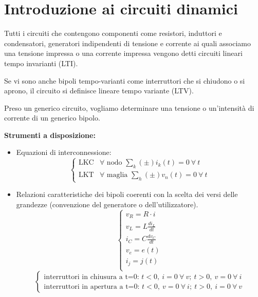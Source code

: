 \section{Introduzione ai circuiti dinamici}
Tutti i circuiti che contengono componenti come
resistori, induttori e condensatori, generatori indipendenti di tensione e corrente ai quali associamo 
una tensione impressa o una corrente impressa vengono detti circuiti lineari tempo invarianti (LTI).

Se vi sono anche bipoli tempo-varianti come interruttori che si chiudono o si aprono, il circuito
si definisce lineare tempo variante (LTV).

Preso un generico circuito, vogliamo determinare una tensione o un'intensità di corrente di un generico
bipolo.

\textbf{Strumenti a disposizione:}

\begin{itemize}
\item Equazioni di interconnessione:
\begin{equation} \label{eq:leggi_kirchooff}
\begin{cases}
        \text{LKC} & \forall \text{ nodo } \sum_{k} (\pm) i_k(t) = 0\ \forall\ t \\
        \text{LKT} & \forall \text{ maglia } \sum_{h} (\pm) v_n(t) = 0\ \forall\ t
\end{cases}
\end{equation}

\item Relazioni caratteristiche dei bipoli coerenti con la scelta dei versi delle grandezze (convenzione del generatore o dell'utilizzatore).
\begin{equation}
\begin{cases}
v_R  = R\cdot i \\
v_L  = L\frac{di_L}{dt} \\
i_C  = C\frac{dv_C}{dt} \\
v_e  = e(t)\\
i_j  = j(t) \\
\end{cases}
\end{equation}
\begin{equation*}
\begin{cases}
\text{interruttori in chiusura a t=0: }  {t<0,\ i = 0\ \forall\ v;\ t > 0,\ v = 0\ \forall\ i} \\
\text{interruttori in apertura a t=0: }  {t<0,\ v = 0\ \forall\ i;\ t > 0,\ i = 0\ \forall\ v} 
\end{cases}
\end{equation*}
\end{itemize}

